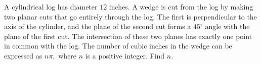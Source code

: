 A cylindrical log has diameter $ 12$ inches. A wedge is cut from the log by making two planar cuts that go entirely through the log. The first is perpendicular to the axis of the cylinder, and the plane of the second cut forms a $ 45^\circ$ angle with the plane of the first cut. The intersection of these two planes has exactly one point in common with the log. The number of cubic inches in the wedge can be expressed as $ n\pi,$ where $ n$ is a positive integer. Find $ n.$